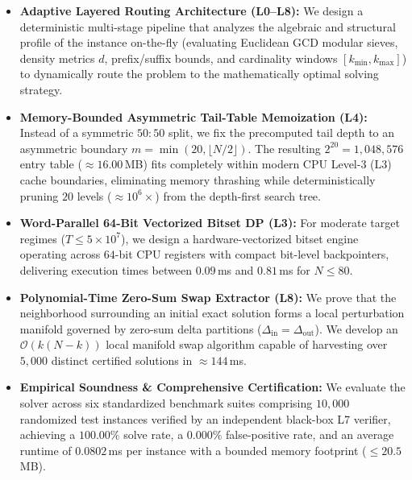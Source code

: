 \documentclass[journal,onecolumn,11pt]{IEEEtran}
\begin{document}
\begin{itemize}
    \item \textbf{Adaptive Layered Routing Architecture (L0--L8):} We design a deterministic multi-stage pipeline that analyzes the algebraic and structural profile of the instance on-the-fly (evaluating Euclidean GCD modular sieves, density metrics $d$, prefix/suffix bounds, and cardinality windows $[k_{\min}, k_{\max}]$) to dynamically route the problem to the mathematically optimal solving strategy.
    
    \item \textbf{Memory-Bounded Asymmetric Tail-Table Memoization (L4):} Instead of a symmetric $50:50$ split, we fix the precomputed tail depth to an asymmetric boundary $m = \min(20, \lfloor N/2 \rfloor)$. The resulting $2^{20} = 1{,}048{,}576$ entry table ($\approx 16.00$\,MB) fits completely within modern CPU Level-3 (L3) cache boundaries, eliminating memory thrashing while deterministically pruning $20$ levels ($\approx 10^6\times$) from the depth-first search tree.
    
    \item \textbf{Word-Parallel 64-Bit Vectorized Bitset DP (L3):} For moderate target regimes ($T \le 5 \times 10^7$), we design a hardware-vectorized bitset engine operating across $64$-bit CPU registers with compact bit-level backpointers, delivering execution times between $0.09$\,ms and $0.81$\,ms for $N \le 80$.
    
    \item \textbf{Polynomial-Time Zero-Sum Swap Extractor (L8):} We prove that the neighborhood surrounding an initial exact solution forms a local perturbation manifold governed by zero-sum delta partitions ($\Delta_{\text{in}} = \Delta_{\text{out}}$). We develop an $\mathcal{O}(k(N-k))$ local manifold swap algorithm capable of harvesting over $5{,}000$ distinct certified solutions in $\approx 144$\,ms.
    
    \item \textbf{Empirical Soundness \& Comprehensive Certification:} We evaluate the solver across six standardized benchmark suites comprising $10{,}000$ randomized test instances verified by an independent black-box L7 verifier, achieving a $100.00\%$ solve rate, a $0.000\%$ false-positive rate, and an average runtime of $0.0802$\,ms per instance with a bounded memory footprint ($\le 20.5$\,MB).
\end{itemize}
\end{document}
